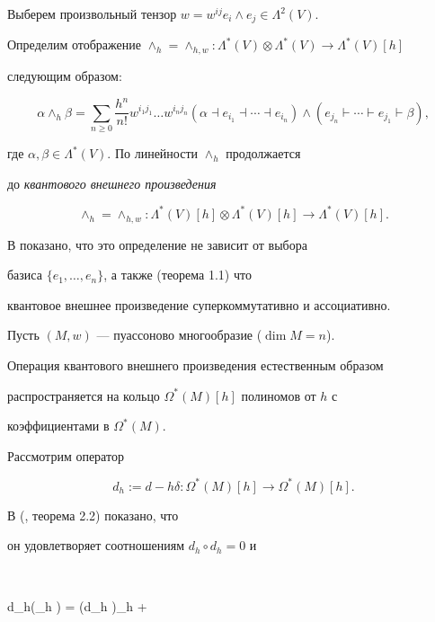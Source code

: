 Выберем произвольный тензор $w=w^{ij}e_i\wedge e_j \in \Lambda^2(V)$.


Определим отображение $\wedge_h=\wedge_{h,w} :


\Lambda^*(V) \otimes \Lambda^*(V)\to \Lambda^*(V)[h]$


следующим образом:


$$


\alpha \wedge_h \beta =


\sum_{n\ge 0} \frac{h^n}{n!} w^{i_1 j_1}\dotsc w^{i_n j_n}


(\alpha \dashv e_{i_1} \dashv \dotsb \dashv e_{i_n}) \wedge


(e_{j_n} \vdash \dotsb \vdash e_{j_1} \vdash \beta),


$$


где $\alpha,\beta\in\Lambda^*(V)$. По линейности $\wedge_h$ продолжается


до {\it квантового внешнего произведения}


$$


\wedge_h=\wedge_{h,w} :


\Lambda^*(V)[h] \otimes \Lambda^*(V)[h]\to \Lambda^*(V)[h].


$$





В \cite{C-Zh} показано, что это определение не зависит от выбора


базиса $\{e_1,\dotsc,e_n\}$, а также (теорема 1.1) что


квантовое внешнее произведение суперкоммутативно и ассоциативно.





Пусть $(M,w)$ --- пуассоново многообразие ($\dim M=n$).


Операция квантового внешнего произведения естественным образом


распространяется на кольцо $\Omega^*(M)[h]$ полиномов от $h$ с


коэффициентами в  $\Omega^*(M)$.


Рассмотрим оператор


$$


d_h:= d - h\delta :  \Omega^*(M)[h]\to \Omega^*(M)[h].


$$


В (\cite{C-Zh}, теорема 2.2) показано, что


он удовлетворяет соотношениям $d_h\circ d_h=0$ и


$$


d_h(\alpha\wedge_h \beta) = (d_h \alpha)\wedge_h \beta +



